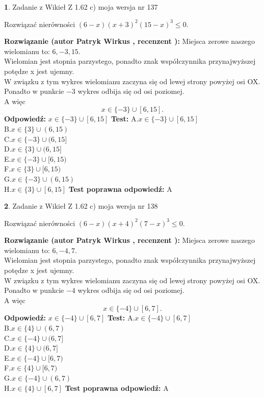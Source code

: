 \documentclass[12pt, a4paper]{article}
\theoremstyle{definition} %
\newtheorem{zad}{}
\newcommand{\zadStart}[1]{\begin{zad}#1\newline}
\newcommand{\zadStop}{\end{zad}}
\newcommand{\rozwStart}[2]{\noindent \textbf{Rozwiązanie (autor #1 , recenzent #2): }\newline}
\newcommand{\rozwStop}{\newline}
\newcommand{\odpStart}{\noindent \textbf{Odpowiedź:}\newline}
\newcommand{\odpStop}{\newline}
\newcommand{\testStart}{\noindent \textbf{Test:}\newline}
\newcommand{\testStop}{\newline}
\newcommand{\kluczStart}{\noindent \textbf{Test poprawna odpowiedź:}\newline}
\newcommand{\kluczStop}{\newline}
\begin{document}
\zadStart{Zadanie z Wikieł Z 1.62 c) moja wersja nr 137}

Rozwiązać nierówności $(6-x)(x+3)^{2}(15-x)^{3}\le0$.
\zadStop
\rozwStart{Patryk Wirkus}{}
Miejsca zerowe naszego wielomianu to: $6, -3, 15$.\\
Wielomian jest stopnia parzystego, ponadto znak współczynnika przy\linebreak najwyższej potędze x jest ujemny.\\ W związku z tym wykres wielomianu zaczyna się od lewej strony powyżej osi OX.\\
Ponadto w punkcie $-3$ wykres odbija się od osi poziomej.\\
A więc $$x \in \{-3\} \cup [6,15].$$
\rozwStop
\odpStart
$x \in \{-3\} \cup [6,15]$
\odpStop
\testStart
A.$x \in \{-3\} \cup [6,15]$\\
B.$x \in \{3\} \cup (6,15)$\\
C.$x \in \{-3\} \cup (6,15]$\\
D.$x \in \{3\} \cup (6,15]$\\
E.$x \in \{-3\} \cup [6,15)$\\
F.$x \in \{3\} \cup [6,15)$\\
G.$x \in \{-3\} \cup (6,15)$\\
H.$x \in \{3\} \cup [6,15]$
\testStop
\kluczStart
A
\kluczStop



\zadStart{Zadanie z Wikieł Z 1.62 c) moja wersja nr 138}

Rozwiązać nierówności $(6-x)(x+4)^{2}(7-x)^{3}\le0$.
\zadStop
\rozwStart{Patryk Wirkus}{}
Miejsca zerowe naszego wielomianu to: $6, -4, 7$.\\
Wielomian jest stopnia parzystego, ponadto znak współczynnika przy\linebreak najwyższej potędze x jest ujemny.\\ W związku z tym wykres wielomianu zaczyna się od lewej strony powyżej osi OX.\\
Ponadto w punkcie $-4$ wykres odbija się od osi poziomej.\\
A więc $$x \in \{-4\} \cup [6,7].$$
\rozwStop
\odpStart
$x \in \{-4\} \cup [6,7]$
\odpStop
\testStart
A.$x \in \{-4\} \cup [6,7]$\\
B.$x \in \{4\} \cup (6,7)$\\
C.$x \in \{-4\} \cup (6,7]$\\
D.$x \in \{4\} \cup (6,7]$\\
E.$x \in \{-4\} \cup [6,7)$\\
F.$x \in \{4\} \cup [6,7)$\\
G.$x \in \{-4\} \cup (6,7)$\\
H.$x \in \{4\} \cup [6,7]$
\testStop
\kluczStart
A
\kluczStop
\end{document}
